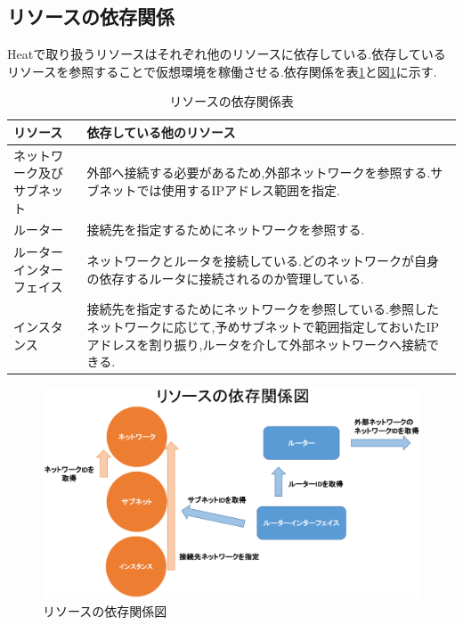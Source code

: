 \documentclass[mingoth]{kut-paper}		%
\begin{document}
	\subsection{リソースの依存関係}
	Heatで取り扱うリソースはそれぞれ他のリソースに依存している.依存しているリソースを参照することで仮想環境を稼働させる.依存関係を表\ref{table:4}と図\ref{graf:7}に示す.
	\begin{table}[H]
		\begin{center}
			\caption{リソースの依存関係表}
			\label{table:4}
			\begin{tabular}{|p{5cm}|p{7cm}|}\hline
				リソース & 依存している他のリソース\\ \hline \hline
				ネットワーク及びサブネット & 外部へ接続する必要があるため,外部ネットワークを参照する.サブネットでは使用するIPアドレス範囲を指定.\\ \hline
				ルーター & 接続先を指定するためにネットワークを参照する.\\ \hline
				ルーターインターフェイス & ネットワークとルータを接続している.どのネットワークが自身の依存するルータに接続されるのか管理している.\\ \hline
				インスタンス & 接続先を指定するためにネットワークを参照している.参照したネットワークに応じて,予めサブネットで範囲指定しておいたIPアドレスを割り振り,ルータを介して外部ネットワークへ接続できる.\\ \hline
			\end{tabular}
		\end{center}
	\end{table}
	
	\begin{figure}[H]
		\begin{center}
			\includegraphics[scale=0.45]{Document/ResourcesRelational.eps}
			\caption{リソースの依存関係図}
			\label{graf:7}
		\end{center}
	\end{figure}
	
\end{document}
